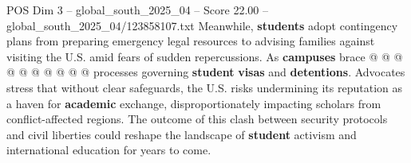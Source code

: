\begin{textsample}{POS Dim 3 – global\_south\_2025\_04 – Score 22.00 – global\_south\_2025\_04/123858107.txt}
Meanwhile, \textbf{students} adopt contingency plans from preparing emergency legal resources to advising families against visiting the U.S. amid fears of sudden repercussions.
As \textbf{campuses} brace @ @ @ @ @ @ @ @ @ @ processes governing \textbf{student} \textbf{visas} and \textbf{detentions}.
Advocates stress that without clear safeguards, the U.S. risks undermining its reputation as a haven for \textbf{academic} exchange, disproportionately impacting scholars from conflict-affected regions.
The outcome of this clash between security protocols and civil liberties could reshape the landscape of \textbf{student} activism and international education for years to come.

\end{textsample}
